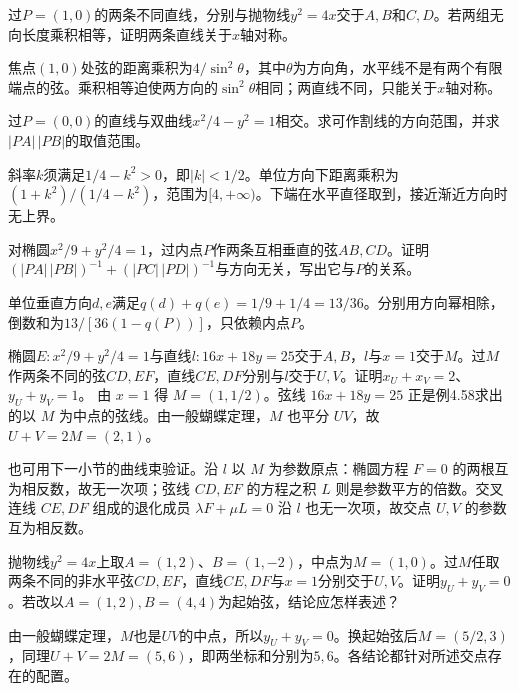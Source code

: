过\(P=(1,0)\)的两条不同直线，分别与抛物线\(y^2=4x\)交于\(A,B\)和\(C,D\)。若两组无向长度乘积相等，证明两条直线关于\(x\)轴对称。
\par
\solutionanswer
焦点\((1,0)\)处弦的距离乘积为\(4/\sin^2\theta\)，其中\(\theta\)为方向角，水平线不是有两个有限端点的弦。乘积相等迫使两方向的\(\sin^2\theta\)相同；两直线不同，只能关于\(x\)轴对称。


过\(P=(0,0)\)的直线与双曲线\(x^2/4-y^2=1\)相交。求可作割线的方向范围，并求\(|PA|\,|PB|\)的取值范围。
\par
\solutionanswer
斜率\(k\)须满足\(1/4-k^2>0\)，即\(|k|<1/2\)。单位方向下距离乘积为\((1+k^2)/(1/4-k^2)\)，范围为\([4,+\infty)\)。下端在水平直径取到，接近渐近方向时无上界。


对椭圆\(x^2/9+y^2/4=1\)，过内点\(P\)作两条互相垂直的弦\(AB,CD\)。证明\((|PA|\,|PB|)^{-1}+(|PC|\,|PD|)^{-1}\)与方向无关，写出它与\(P\)的关系。
\par
\solutionanswer
单位垂直方向\(d,e\)满足\(q(d)+q(e)=1/9+1/4=13/36\)。分别用方向幂相除，倒数和为\(13/[36(1-q(P))]\)，只依赖内点\(P\)。


椭圆\(E:x^2/9+y^2/4=1\)与直线\(l:16x+18y=25\)交于\(A,B\)，\(l\)与\(x=1\)交于\(M\)。过\(M\)作两条不同的弦\(CD,EF\)，直线\(CE,DF\)分别与\(l\)交于\(U,V\)。证明\(x_U+x_V=2\)、\(y_U+y_V=1\)。
\solutionanswer
由 \(x=1\) 得 \(M=(1,1/2)\)。弦线 \(16x+18y=25\) 正是例4.58求出的以 \(M\) 为中点的弦线。由一般蝴蝶定理，\(M\) 也平分 \(UV\)，故 \(U+V=2M=(2,1)\)。

也可用下一小节的曲线束验证。沿 \(l\) 以 \(M\) 为参数原点：椭圆方程 \(F=0\) 的两根互为相反数，故无一次项；弦线 \(CD,EF\) 的方程之积 \(L\) 则是参数平方的倍数。交叉连线 \(CE,DF\) 组成的退化成员 \(\lambda F+\mu L=0\) 沿 \(l\) 也无一次项，故交点 \(U,V\) 的参数互为相反数。


抛物线\(y^2=4x\)上取\(A=(1,2)\)、\(B=(1,-2)\)，中点为\(M=(1,0)\)。过\(M\)任取两条不同的非水平弦\(CD,EF\)，直线\(CE,DF\)与\(x=1\)分别交于\(U,V\)。证明\(y_U+y_V=0\)。若改以\(A=(1,2),B=(4,4)\)为起始弦，结论应怎样表述？
\par
\solutionanswer
由一般蝴蝶定理，\(M\)也是\(UV\)的中点，所以\(y_U+y_V=0\)。换起始弦后\(M=(5/2,3)\)，同理\(U+V=2M=(5,6)\)，即两坐标和分别为\(5,6\)。各结论都针对所述交点存在的配置。


